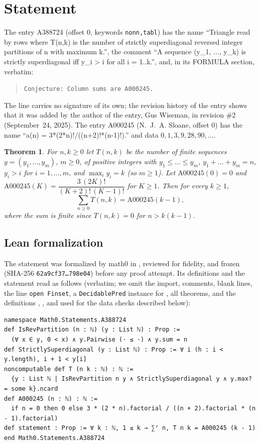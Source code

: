 \documentclass[11pt]{amsart}
\theoremstyle{plain}
\newtheorem{theorem}{Theorem}
\theoremstyle{definition}
\begin{document}
\section{Statement}\label{sec:statement}

The entry A388724 \cite{A388724} (offset $0$, keywords \texttt{nonn,tabl}) has the name ``Triangle read by rows where T(n,k) is the number of strictly superdiagonal reversed integer partitions of n with maximum k.'', the comment ``A sequence (y\_1, ..., y\_k) is strictly superdiagonal iff y\_i \textgreater{} i for all i = 1..k.'', and, in its FORMULA section, verbatim:
\begin{quote}\raggedright
\texttt{Conjecture: Column sums are A000245.}
\end{quote}
The line carries no signature of its own; the revision history of the entry shows that it was added by the author of the entry, Gus Wiseman, in revision \#2 (September~24, 2025). The entry A000245 \cite{A000245} (N.~J.~A. Sloane, offset $0$) has the name ``a(n) = 3*(2*n)!/((n+2)!*(n-1)!).'' and data $0,1,3,9,28,90,\dots$.

\begin{theorem}\label{thm:main}
For $n,k\ge0$ let $T(n,k)$ be the number of finite sequences $y=(y_1,\dots,y_m)$, $m\ge0$, of positive integers with $y_1\le\dots\le y_m$, $y_1+\dots+y_m=n$, $y_i>i$ for $i=1,\dots,m$, and $\max_i y_i=k$ (so $m\ge1$). Let $\mathrm{A000245}(0)=0$ and $\mathrm{A000245}(K)=\dfrac{3\,(2K)!}{(K+2)!\,(K-1)!}$ for $K\ge1$. Then for every $k\ge1$,
\[
  \sum_{n\ge0}T(n,k)=\mathrm{A000245}(k-1),
\]
where the sum is finite since $T(n,k)=0$ for $n>k(k-1)$.
\end{theorem}

\subsection*{Lean formalization}
The statement was formalized by math0 in , reviewed for fidelity, and frozen (SHA-256 \texttt{62a9cf37\ldots 798e04}) before any proof attempt. Its definitions and the statement read as follows (verbatim; we omit the import, comments, blank lines, the line \texttt{open Finset}, a \texttt{DecidablePred} instance for , all theorems, and the definitions , ,  and  used for the data checks described below):
\begin{lstlisting}
namespace Math0.Statements.A388724
def IsRevPartition (n : ℕ) (y : List ℕ) : Prop :=
  (∀ x ∈ y, 0 < x) ∧ y.Pairwise (· ≤ ·) ∧ y.sum = n
def StrictlySuperdiagonal (y : List ℕ) : Prop := ∀ i (h : i < y.length), i + 1 < y[i]
noncomputable def T (n k : ℕ) : ℕ :=
  {y : List ℕ | IsRevPartition n y ∧ StrictlySuperdiagonal y ∧ y.max? = some k}.ncard
def A000245 (n : ℕ) : ℕ :=
  if n = 0 then 0 else 3 * (2 * n).factorial / ((n + 2).factorial * (n - 1).factorial)
def statement : Prop := ∀ k : ℕ, 1 ≤ k → ∑ᶠ n, T n k = A000245 (k - 1)
end Math0.Statements.A388724
\end{lstlisting}
\end{document}
